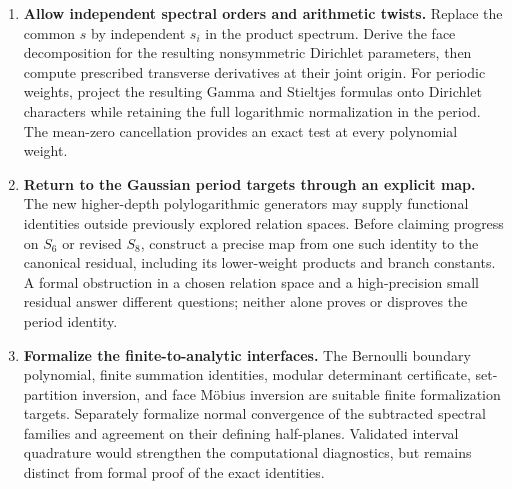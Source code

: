 \documentclass[11pt,a4paper]{article}
\numberwithin{equation}{section}
\theoremstyle{definition}
\theoremstyle{remark}
\begin{document}
\begin{enumerate}[label=\textbf{R\arabic*.}]
\item \textbf{Allow independent spectral orders and arithmetic twists.}
Replace the common $s$ by independent $s_i$ in the product spectrum.
Derive the face decomposition for the resulting nonsymmetric Dirichlet
parameters, then compute prescribed transverse derivatives at their
joint origin. For periodic weights, project the resulting Gamma and
Stieltjes formulas onto Dirichlet characters while retaining the full
logarithmic normalization in the period. The mean-zero cancellation
provides an exact test at every polynomial weight.

\item \textbf{Return to the Gaussian period targets through an explicit
map.}
The new higher-depth polylogarithmic generators may supply functional
identities outside previously explored relation spaces. Before claiming
progress on $S_6$ or revised $S_8$, construct a precise map from one
such identity to the canonical residual, including its lower-weight
products and branch constants. A formal obstruction in a chosen
relation space and a high-precision small residual answer different
questions; neither alone proves or disproves the period identity.

\item \textbf{Formalize the finite-to-analytic interfaces.}
The Bernoulli boundary polynomial, finite summation identities,
modular determinant certificate, set-partition inversion, and face
M\"obius inversion are suitable finite formalization targets.
Separately formalize normal convergence of the subtracted spectral
families and agreement on their defining half-planes. Validated
interval quadrature would strengthen the computational diagnostics,
but remains distinct from formal proof of the exact identities.
\end{enumerate}

\end{document}
